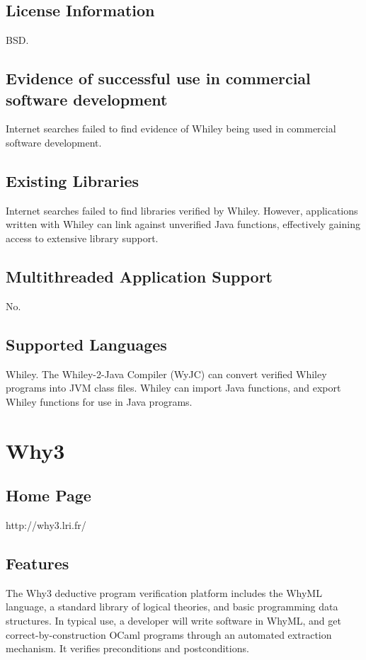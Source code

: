 \documentclass[12pt,openany,a4paper]{book}
\begin{document}
	\subsection{License Information}
	BSD.
	\subsection{Evidence of successful use in commercial software development}
		Internet searches failed to find evidence of Whiley being used in commercial software development.
	\subsection{Existing Libraries}
		Internet searches failed to find libraries verified by Whiley. However, applications written with Whiley can link against unverified Java functions, effectively gaining access to extensive library support.
	\subsection{Multithreaded Application Support}
	No.
	\subsection{Supported Languages}
	Whiley. The Whiley-2-Java Compiler (WyJC) can convert verified Whiley programs into JVM class files. Whiley can import Java functions, and export Whiley functions for use in Java programs.






\section{Why3}
	\subsection{Home Page}
	http://why3.lri.fr/
	\subsection{Features}
	The Why3 deductive program verification platform includes the WhyML language, a standard library of logical theories, and basic programming data structures\cite{why3homepage}. In typical use, a developer will write software in WhyML, and get correct-by-construction OCaml programs through an automated extraction mechanism. It verifies preconditions and postconditions.
	
\end{document}
